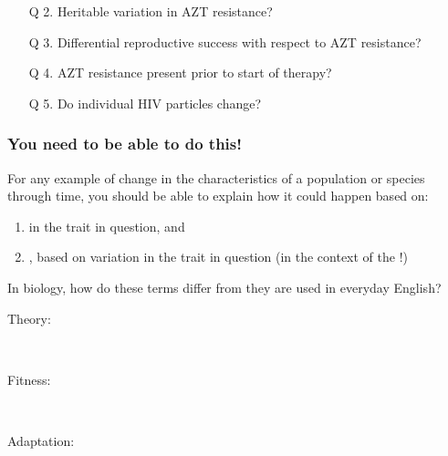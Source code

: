 \begin{frame}
    \begin{enumerate}%

        \item[Q 2.] Heritable variation in AZT resistance?
        
        \vspace{1cm}
        \item[Q 3.] Differential reproductive success with respect to AZT resistance?

        \vspace{1cm}
        \item[Q 4.] AZT resistance present prior to start of therapy?

        \vspace{1cm}
        \item[Q 5.] Do individual HIV particles change?
    \end{enumerate}
\end{frame}

\begin{frame}
    \frametitle{You need to be able to do this!}

    For any example of change in the characteristics of a population or species
    through time, you should be able to explain how it could happen based on: 

    \begin{enumerate}
        \item<2->  in the trait in question, and 

        \item<3-> , based on
            variation in the trait in question (in the context of the
            !)
    \end{enumerate}
\end{frame}

\begin{frame}
    In biology, how do these terms differ from they are used in everyday
    English?
    \begin{description}
        \item[Theory:] \ \\
        \item[Fitness:] \ \\
            \vspace{1cm}
        \item[Adaptation:] \ \\
    \end{description}
\end{frame}

